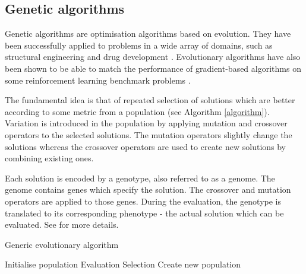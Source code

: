 \subsection{Genetic algorithms}
Genetic algorithms are optimisation algorithms based on evolution. They have been successfully
applied to problems in a wide array of domains, such as structural engineering \cite{engineering_gas}
and drug development \cite{drug_gas}. Evolutionary algorithms have also been shown to be able to match
the performance of gradient-based algorithms on some reinforcement learning benchmark problems \cite{es_reinforce}.

The fundamental idea is that of repeated selection of solutions which are better according to
some metric from a population (see Algorithm \ref{algorithm}).
Variation is introduced in the population by applying mutation and crossover operators to the
selected solutions. The mutation operators slightly change the solutions whereas the crossover
operators are used to create new solutions by combining existing ones.

Each solution is encoded by a genotype, also referred to as a genome. The genome contains
genes which specify the solution. The crossover and mutation operators are applied to those genes.
During the evaluation, the genotype is translated to its corresponding phenotype -
the actual solution which can be evaluated. See \cite{compint} for more details.


\begin{algorithm}[H]
    \caption{Generic evolutionary algorithm}
    \begin{algorithmic}

    \State Initialise population
        \State Evaluation 
        \State Selection  
        \State Create new population 
    \EndWhile
\EndProcedure

\end{algorithmic}
\label{algorithm}
\end{algorithm}
